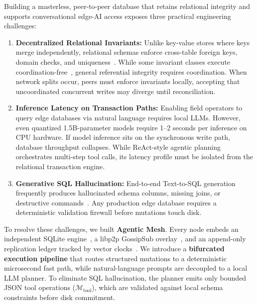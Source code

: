 Building a masterless, peer-to-peer database that retains relational integrity and supports conversational edge-AI access exposes three practical engineering challenges:
\begin{enumerate}
    \item \textbf{Decentralized Relational Invariants:} Unlike key-value stores where keys merge independently, relational schemas enforce cross-table foreign keys, domain checks, and uniqueness~\cite{codd1970relational}. While some invariant classes execute coordination-free~\cite{bailis2014coordination}, general referential integrity requires coordination. When network splits occur, peers must enforce invariants locally, accepting that uncoordinated concurrent writes may diverge until reconciliation.
    \item \textbf{Inference Latency on Transaction Paths:} Enabling field operators to query edge databases via natural language requires local LLMs. However, even quantized 1.5B-parameter models require 1--2 seconds per inference on CPU hardware. If model inference sits on the synchronous write path, database throughput collapses. While ReAct-style agentic planning~\cite{yao2023react} orchestrates multi-step tool calls, its latency profile must be isolated from the relational transaction engine.
    \item \textbf{Generative SQL Hallucination:} End-to-end Text-to-SQL generation frequently produces hallucinated schema columns, missing joins, or destructive commands~\cite{ji2023hallucination, singh2025llmtexttosql}. Any production edge database requires a deterministic validation firewall before mutations touch disk.
\end{enumerate}

To resolve these challenges, we built \textbf{Agentic Mesh}. Every node embeds an independent SQLite engine~\cite{hipp2020sqlite}, a libp2p GossipSub overlay~\cite{trautwein2022libp2p, vyzovitis2020gossipsub}, and an append-only replication ledger tracked by vector clocks~\cite{fidge1988timestamps, lamport1978time}. We introduce a \textbf{bifurcated execution pipeline} that routes structured mutations to a deterministic microsecond fast path, while natural-language prompts are decoupled to a local LLM planner. To eliminate SQL hallucination, the planner emits only bounded JSON tool operations ($\mathcal{M}_{\text{tool}}$), which are validated against local schema constraints before disk commitment.


